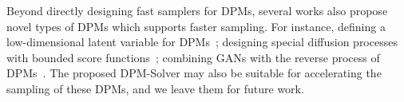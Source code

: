 Beyond directly designing fast samplers for DPMs, several works also propose novel types of DPMs which supports faster sampling. For instance, defining a low-dimensional latent variable for DPMs~\citep{vahdat2021score}; designing special diffusion processes with bounded score functions~\citep{dockhorn2021score}; combining GANs with the reverse process of DPMs~\citep{xiao2021tackling}. The proposed DPM-Solver may also be suitable for accelerating the sampling of these DPMs, and we leave them for future work.
